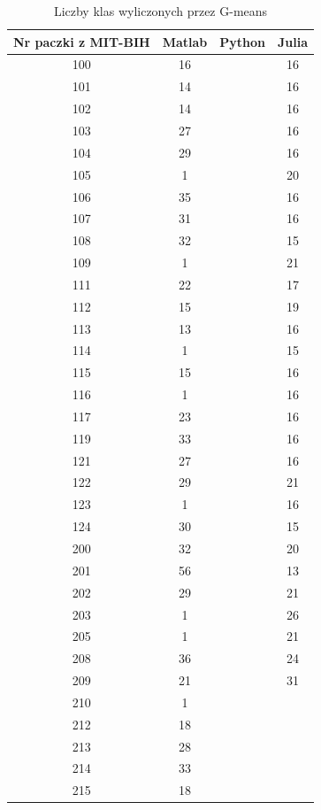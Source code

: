 \begin{table}[!tp]
	\centering
	\caption{Liczby klas wyliczonych przez G-means}
	\label{tabResults2}
	\begin{tabular}{|c|c|c|c|}
		\hline
		Nr paczki z MIT-BIH & Matlab & Python & Julia\\ \hline		
		100 & 16 &  & 16\\ \hline
		101 & 14 &  & 16\\ \hline
		102 & 14 &  & 16\\ \hline
		103 & 27 &  & 16\\ \hline
		104 & 29 &  & 16\\ \hline
		105 &  1 &  & 20\\ \hline
		106 & 35 &  & 16\\ \hline
		107 & 31 &  & 16\\ \hline
		108 & 32 &  & 15\\ \hline
		109 &  1 &  & 21\\ \hline
		111 & 22 &  & 17\\ \hline
		112 & 15 &  & 19\\ \hline
		113 & 13 &  & 16\\ \hline
		114 &  1 &  & 15\\ \hline
		115 & 15 &  & 16\\ \hline
		116 &  1 &  & 16\\ \hline
		117 & 23 &  & 16\\ \hline
		119 & 33 &  & 16\\ \hline
		121 & 27 &  & 16\\ \hline
		122 & 29 &  & 21\\ \hline
		123 &  1 &  & 16\\ \hline
		124 & 30 &  & 15\\ \hline
		200 & 32 &  & 20\\ \hline
		201 & 56 &  & 13\\ \hline
		202 & 29 &  & 21\\ \hline
		203 &  1 &  & 26\\ \hline
		205 &  1 &  & 21\\ \hline
		208 & 36 &  & 24\\ \hline
		209 & 21 &  & 31\\ \hline
		210 &  1 &  & \\ \hline
		212 & 18 &  & \\ \hline
		213 & 28 &  & \\ \hline
		214 & 33 &  & \\ \hline
		215 & 18 &  & \\ \hline

\end{tabular}
\end{table}
